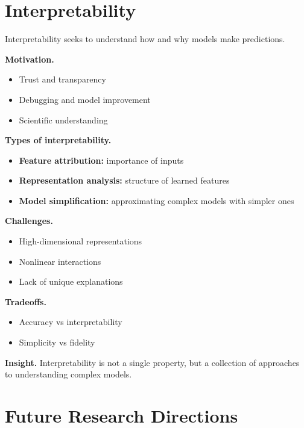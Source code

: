 \section{Interpretability}

Interpretability seeks to understand how and why models make predictions.

\medskip

\noindent
\textbf{Motivation.}
\begin{itemize}
    \item Trust and transparency
    \item Debugging and model improvement
    \item Scientific understanding
\end{itemize}

\medskip

\noindent
\textbf{Types of interpretability.}
\begin{itemize}
    \item \textbf{Feature attribution:} importance of inputs
    \item \textbf{Representation analysis:} structure of learned features
    \item \textbf{Model simplification:} approximating complex models with simpler ones
\end{itemize}

\medskip

\noindent
\textbf{Challenges.}
\begin{itemize}
    \item High-dimensional representations
    \item Nonlinear interactions
    \item Lack of unique explanations
\end{itemize}

\medskip

\noindent
\textbf{Tradeoffs.}
\begin{itemize}
    \item Accuracy vs interpretability
    \item Simplicity vs fidelity
\end{itemize}

\medskip

\noindent
\textbf{Insight.}  
Interpretability is not a single property, but a collection of approaches to understanding complex models.

\section{Future Research Directions}

